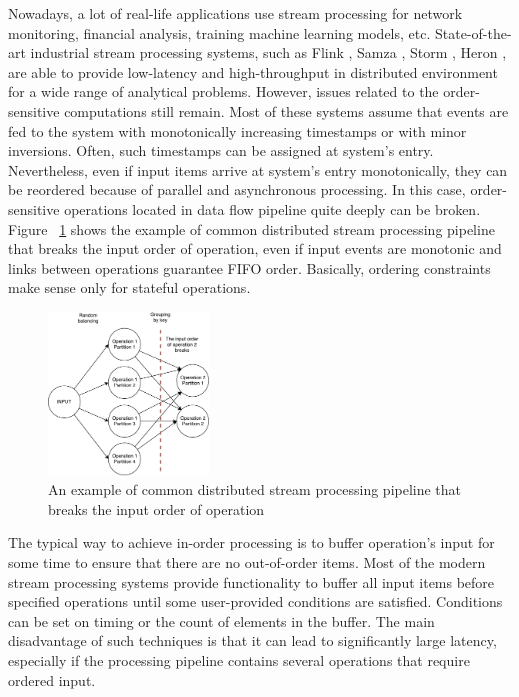 
\label {fs-intro}

Nowadays, a lot of real-life applications use stream processing for network monitoring, financial analysis, training machine learning models, etc. State-of-the-art industrial stream processing systems, such as Flink \cite{carbone2015apache}, Samza \cite{Noghabi:2017:SSS:3137765.3137770}, Storm \cite{apache:storm}, Heron \cite{Kulkarni:2015:THS:2723372.2742788}, are able to provide low-latency and high-throughput in distributed environment for a wide range of analytical problems. However, issues related to the order-sensitive computations still remain. Most of these systems assume that events are fed to the system with monotonically increasing timestamps or with minor inversions. Often, such timestamps can be assigned at system's entry. Nevertheless, even if input items arrive at system's entry monotonically, they can be reordered because of parallel and asynchronous processing. In this case, order-sensitive operations located in data flow pipeline quite deeply can be broken. Figure ~\ref{break-order-dataflow} shows the example of common distributed stream processing pipeline that breaks the input order of operation, even if input events are monotonic and links between operations guarantee FIFO order. Basically, ordering constraints make sense only for stateful operations.

\begin{figure}[htbp]
  \centering
  \includegraphics[width=0.38\textwidth]{pics/break_order_pipeline}
  \caption{An  example of common distributed stream processing pipeline that breaks the input order of operation}
  \label {break-order-dataflow}
\end{figure}

The typical way to achieve in-order processing is to buffer operation's input for some time to ensure that there are no out-of-order items. Most of the modern stream processing systems provide functionality to buffer all input items before specified operations until some user-provided conditions are satisfied. Conditions can be set on timing or the count of elements in the buffer. The main disadvantage of such techniques is that it can lead to significantly large latency, especially if the processing pipeline contains several operations that require ordered input. 

